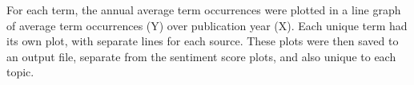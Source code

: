 \documentclass{report}
\begin{document}
For each term, the annual average term occurrences were plotted in a line graph of average term occurrences (Y) over publication year (X).
Each unique term had its own plot, with separate lines for each source. 
These plots were then saved to an output file, separate from the sentiment score plots, and also unique to each topic. 





\end{document}
